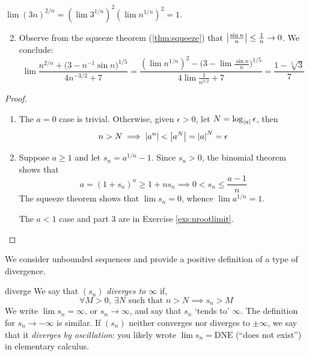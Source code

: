 \begin{examples}{}{}
	\exstart $\lim (3n)^{2/n}=(\lim 3^{1/n})^2(\lim n^{1/n})^2=1$.
	\begin{enumerate}\setcounter{enumi}{1}
		\item Observe from the squeeze theorem (\ref{thm:squeeze}) that $\left| \frac{\sin n}n\right|\le \frac 1n\to 0$. We conclude:
		\[
			\lim\frac{n^{2/n}+\bigl(3-n^{-1}\sin n\bigr)^{1/5}}{4n^{-3/2}+7} =\frac{(\lim n^{1/n})^2 -\bigl(3-\lim\frac{\sin n}n\bigr)^{1/5}}{4\lim \frac 1{n^{3/2}}+7} =\frac{1-\sqrt[5]{3}}7
		\]
	\end{enumerate}
\end{examples}


\begin{proof}
	\begin{enumerate}
		\item The $a=0$ case is trivial. Otherwise, given $\epsilon>0$, let $N=\log_{\left| a\right|}\epsilon$, then
		\[
			n>N\implies \left| a^n\right|<\left| a^N\right|=\left| a\right|^N=\epsilon
		\]
		\item Suppose $a\ge 1$ and let $s_n=a^{1/n}-1$. Since $s_n>0$, the binomial theorem\footnotemark{} shows that
		\[
			a=(1+s_n)^n\ge 1+ns_n\implies 0<s_n\le\frac{a-1}n
		\]
		The squeeze theorem shows that $\lim s_n=0$, whence $\lim a^{1/n}=1$.\par
		The $a<1$ case and part 3 are in Exercise \ref{exs:nrootlimit}.\qedhere
	\end{enumerate}
\end{proof}




\goodbreak




We consider unbounded sequences and provide a positive definition of a type of divergence.

\begin{defn}{}{diverge}
	We say that $(s_n)$ \emph{diverges to $\infty$} if,
	\[
		\forall M>0,\ \exists N\text{ such that }n>N\implies s_n>M
	\]
	We write $\lim s_n=\infty$, or $s_n\to\infty$, and say that $s_n$ `tends to' $\infty$. The definition for $s_n\to-\infty$ is similar.\smallbreak
	If $(s_n)$ neither converges nor diverges to $\pm\infty$, we say that it \emph{diverges by oscillation}: you likely wrote $\lim s_n=\text{DNE}$ (``does not exist'') in elementary calculus.
\end{defn}


